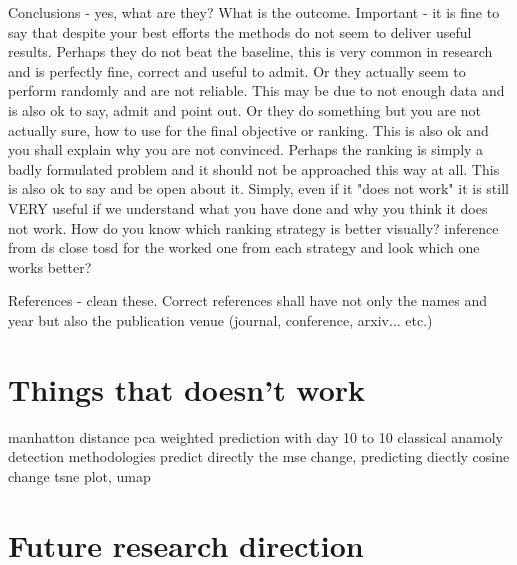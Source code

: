 	
	Conclusions - yes, what are they? What is the outcome. Important - it is fine to say that despite your best efforts the methods do not seem to
	 deliver useful results. Perhaps they do not beat the baseline, this is very common in research and is perfectly fine, correct and useful to admit.
	  Or they actually seem to perform randomly and are not reliable. This may be due to not enough data and is also ok to say, admit and point out. Or 
	  they do something but you are not actually sure, how to use for the final objective or ranking. This is also ok and you shall explain why you are 
	  not convinced. Perhaps the ranking is simply a badly formulated problem and it should not be approached this way at all. This is also ok to say and 
	  be open about it. Simply, even if it "does not work" it is still VERY useful if we understand what you have done and why you think it does not work.	
How do you know which ranking strategy is better visually? inference from ds close tosd for the worked one from each strategy and look which one works 
better?

References - clean these. Correct references shall have not only the names and year but also the publication venue (journal, conference, arxiv... etc.)

\section{Things that doesn't work}
manhatton distance 
pca weighted 
prediction with day 10 to 10 classical anamoly detection methodologies
predict directly the mse change, predicting diectly cosine change
tsne plot, umap

\section{Future research direction}

